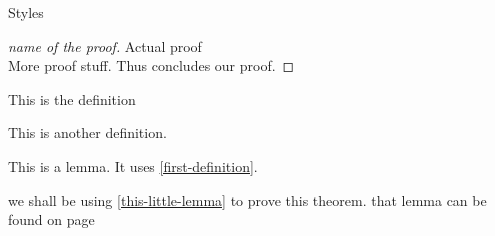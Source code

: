 \large Styles
\begin{proof}[name of the proof]
    Actual proof\\ 

    More proof stuff.
    Thus concludes our proof.
\end{proof}

\begin{definition}
    \label{first-definition}
    This is the definition
\end{definition}

\begin{definition}
    This is another definition.
\end{definition}

\begin{lemma}
    \label{this-little-lemma}
    This is a lemma. It uses \ref{first-definition}.
\end{lemma}

\begin{theorem}
\end{theorem}
we shall be using \ref{this-little-lemma} to prove this theorem. that lemma can be found on page \pageref{this-little-lemma}